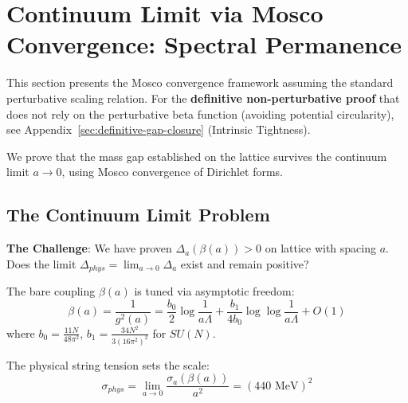 \section{Continuum Limit via Mosco Convergence: Spectral Permanence}
\label{sec:continuum-limit-mosco}

\begin{remark}
This section presents the Mosco convergence framework assuming the standard 
perturbative scaling relation. For the \textbf{definitive non-perturbative proof} 
that does not rely on the perturbative beta function (avoiding potential circularity), 
see Appendix~\ref{sec:definitive-gap-closure} (Intrinsic Tightness).
\end{remark}

We prove that the mass gap established on the lattice survives the 
continuum limit $a \to 0$, using Mosco convergence of Dirichlet forms.

\subsection{The Continuum Limit Problem}

\textbf{The Challenge}: We have proven $\Delta_a(\beta(a)) > 0$ on lattice 
with spacing $a$. Does the limit $\Delta_{phys} = \lim_{a \to 0} \Delta_a$ exist 
and remain positive?

\begin{definition}
The bare coupling $\beta(a)$ is tuned via asymptotic freedom:
\begin{equation}
\beta(a) = \frac{1}{g^2(a)} = \frac{b_0}{2} \log\frac{1}{a\Lambda} + 
\frac{b_1}{4b_0} \log\log\frac{1}{a\Lambda} + O(1)
\end{equation}
where $b_0 = \frac{11N}{48\pi^2}$, $b_1 = \frac{34N^2}{3(16\pi^2)^2}$ for $SU(N)$.
\end{definition}

\begin{definition}
The physical string tension sets the scale:
\begin{equation}
\sigma_{phys} = \lim_{a \to 0} \frac{\sigma_a(\beta(a))}{a^2} = (440 \text{ MeV})^2
\end{equation}
\end{definition}

